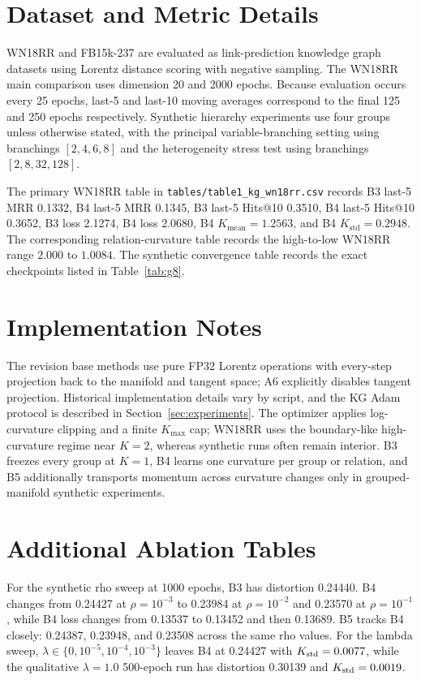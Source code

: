 \section{Dataset and Metric Details}

WN18RR and FB15k-237 are evaluated as link-prediction knowledge graph datasets using Lorentz distance scoring with negative sampling. The WN18RR main comparison uses dimension 20 and 2000 epochs. Because evaluation occurs every 25 epochs, last-5 and last-10 moving averages correspond to the final 125 and 250 epochs respectively. Synthetic hierarchy experiments use four groups unless otherwise stated, with the principal variable-branching setting using branchings $[2,4,6,8]$ and the heterogeneity stress test using branchings $[2,8,32,128]$.

The primary WN18RR table in \texttt{tables/table1\_kg\_wn18rr.csv} records B3 last-5 MRR 0.1332, B4 last-5 MRR 0.1345, B3 last-5 Hits@10 0.3510, B4 last-5 Hits@10 0.3652, B3 loss 2.1274, B4 loss 2.0680, B4 $K_{\mathrm{mean}}=1.2563$, and B4 $K_{\mathrm{std}}=0.2948$. The corresponding relation-curvature table records the high-to-low WN18RR range $2.000$ to $1.0084$. The synthetic convergence table records the exact checkpoints listed in Table~\ref{tab:g8}.

\section{Implementation Notes}

The revision base methods use pure FP32 Lorentz operations with every-step projection back to the manifold and tangent space; A6 explicitly disables tangent projection. Historical implementation details vary by script, and the KG Adam protocol is described in Section~\ref{sec:experiments}. The optimizer applies log-curvature clipping and a finite $K_{\max}$ cap; WN18RR uses the boundary-like high-curvature regime near $K=2$, whereas synthetic runs often remain interior. B3 freezes every group at $K=1$, B4 learns one curvature per group or relation, and B5 additionally transports momentum across curvature changes only in grouped-manifold synthetic experiments.

\section{Additional Ablation Tables}

For the synthetic rho sweep at 1000 epochs, B3 has distortion 0.24440. B4 changes from 0.24427 at $\rho=10^{-3}$ to 0.23984 at $\rho=10^{-2}$ and 0.23570 at $\rho=10^{-1}$, while B4 loss changes from 0.13537 to 0.13452 and then 0.13689. B5 tracks B4 closely: 0.24387, 0.23948, and 0.23508 across the same rho values. For the lambda sweep, $\lambda\in\{0,10^{-5},10^{-4},10^{-3}\}$ leaves B4 at 0.24427 with $K_{\mathrm{std}}=0.0077$, while the qualitative $\lambda=1.0$ 500-epoch run has distortion 0.30139 and $K_{\mathrm{std}}=0.0019$.

